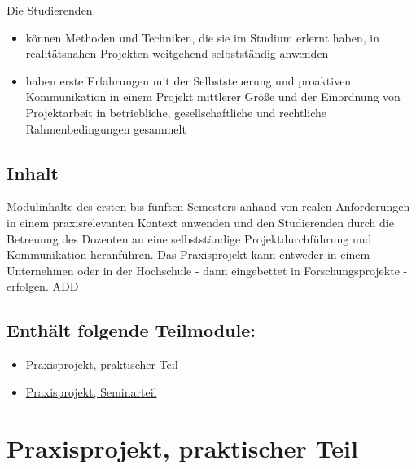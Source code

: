 Die Studierenden

\begin{itemize}
\tightlist
\item
  können Methoden und Techniken, die sie im Studium erlernt haben, in
  realitätsnahen Projekten weitgehend selbstständig anwenden
\item
  haben erste Erfahrungen mit der Selbststeuerung und proaktiven
  Kommunikation in einem Projekt mittlerer Größe und der Einordnung von
  Projektarbeit in betriebliche, gesellschaftliche und rechtliche
  Rahmenbedingungen gesammelt
\end{itemize}

\hypertarget{inhaltpathlabelmi-2017modulbeschreibungen-bachelorba_praxisprojekt}{%
\section*{Inhalt\label{/mi-2017/modulbeschreibungen-bachelor/BA_Praxisprojekt}}\label{inhaltpathlabelmi-2017modulbeschreibungen-bachelorba_praxisprojekt}}

Modulinhalte des ersten bis fünften Semesters anhand von realen
Anforderungen in einem praxisrelevanten Kontext anwenden und den
Studierenden durch die Betreuung des Dozenten an eine selbstständige
Projektdurchführung und Kommunikation heranführen. Das Praxisprojekt
kann entweder in einem Unternehmen oder in der Hochschule - dann
eingebettet in Forschungsprojekte - erfolgen. ADD

\hypertarget{enthuxe4lt-folgende-teilmodulepathlabelmi-2017modulbeschreibungen-bachelorba_praxisprojekt}{%
\section*{Enthält folgende
Teilmodule:\label{/mi-2017/modulbeschreibungen-bachelor/BA_Praxisprojekt}}\label{enthuxe4lt-folgende-teilmodulepathlabelmi-2017modulbeschreibungen-bachelorba_praxisprojekt}}

\begin{itemize}
\tightlist
\item
  \hyperref[/mi-2017/modulbeschreibungen-bachelor/BA_Praxisprojektarbeit]{Praxisprojekt, praktischer Teil}
\item
  \hyperref[/mi-2017/modulbeschreibungen-bachelor/BA_Praxisprojektseminar]{Praxisprojekt, Seminarteil}
\end{itemize}

\hypertarget{praxisprojekt-praktischer-teilpathlabelmi-2017modulbeschreibungen-bachelorba_praxisprojektarbeit}{%
\chapter{Praxisprojekt, praktischer
Teil\label{/mi-2017/modulbeschreibungen-bachelor/BA_Praxisprojektarbeit}}\label{praxisprojekt-praktischer-teilpathlabelmi-2017modulbeschreibungen-bachelorba_praxisprojektarbeit}}

